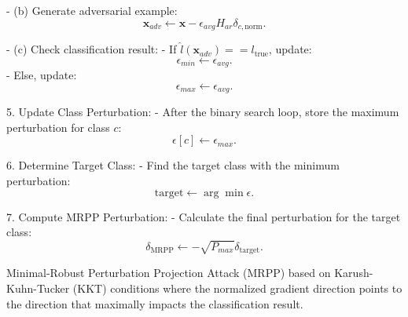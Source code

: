      - (b) Generate adversarial example:
       \[
       \mathbf{x}_{adv} \gets \mathbf{x} - \epsilon_{avg} H_{ar} \delta_{c,\text{norm}}.
       \]

     - (c) Check classification result:
       - If $\hat{l}(\mathbf{x}_{adv}) == l_{\text{true}}$, update:
         \[
         \epsilon_{min} \gets \epsilon_{avg}.
         \]
       - Else, update:
         \[
         \epsilon_{max} \gets \epsilon_{avg}.
         \]

5. Update Class Perturbation:
   - After the binary search loop, store the maximum perturbation for class $c$:
     \[
     \epsilon[c] \gets \epsilon_{max}.
     \]

6. Determine Target Class:
   - Find the target class with the minimum perturbation:
     \[
     \text{target} \gets \arg \min \epsilon.
     \]

7. Compute MRPP Perturbation:
   - Calculate the final perturbation for the target class:
     \[
     \delta_{\text{MRPP}} \gets -\sqrt{P_{max}} \delta_{\text{target}}.
     \]

Minimal-Robust Perturbation Projection Attack (MRPP) based on Karush-Kuhn-Tucker (KKT) conditions where the normalized gradient direction points to the direction that maximally impacts the classification result.